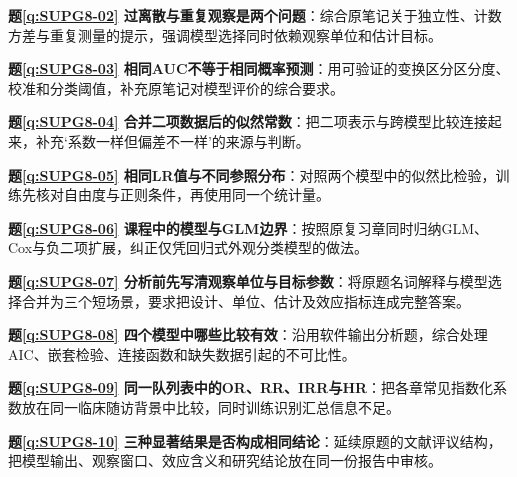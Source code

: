 \noindent\textbf{题\ref*{q:SUPG8-02} 过离散与重复观察是两个问题}：综合原笔记关于独立性、计数方差与重复测量的提示，强调模型选择同时依赖观察单位和估计目标。\par

\noindent\textbf{题\ref*{q:SUPG8-03} 相同AUC不等于相同概率预测}：用可验证的变换区分区分度、校准和分类阈值，补充原笔记对模型评价的综合要求。\par

\noindent\textbf{题\ref*{q:SUPG8-04} 合并二项数据后的似然常数}：把二项表示与跨模型比较连接起来，补充‘系数一样但偏差不一样’的来源与判断。\par

\noindent\textbf{题\ref*{q:SUPG8-05} 相同LR值与不同参照分布}：对照两个模型中的似然比检验，训练先核对自由度与正则条件，再使用同一个统计量。\par

\noindent\textbf{题\ref*{q:SUPG8-06} 课程中的模型与GLM边界}：按照原复习章同时归纳GLM、Cox与负二项扩展，纠正仅凭回归式外观分类模型的做法。\par

\noindent\textbf{题\ref*{q:SUPG8-07} 分析前先写清观察单位与目标参数}：将原题名词解释与模型选择合并为三个短场景，要求把设计、单位、估计及效应指标连成完整答案。\par

\noindent\textbf{题\ref*{q:SUPG8-08} 四个模型中哪些比较有效}：沿用软件输出分析题，综合处理AIC、嵌套检验、连接函数和缺失数据引起的不可比性。\par

\noindent\textbf{题\ref*{q:SUPG8-09} 同一队列表中的OR、RR、IRR与HR}：把各章常见指数化系数放在同一临床随访背景中比较，同时训练识别汇总信息不足。\par

\noindent\textbf{题\ref*{q:SUPG8-10} 三种显著结果是否构成相同结论}：延续原题的文献评议结构，把模型输出、观察窗口、效应含义和研究结论放在同一份报告中审核。\par

\endgroup
